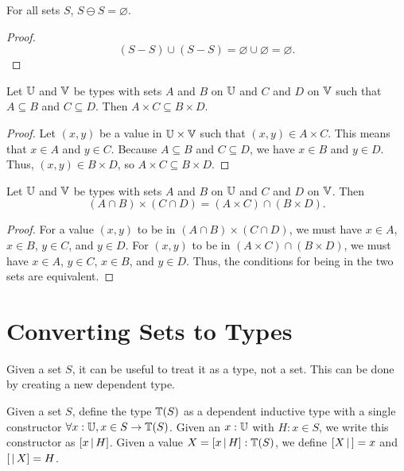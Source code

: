 \documentclass[../math.tex]{subfiles}
\begin{document}
\begin{theorem}
    For all sets $S$, $S \ominus S = \varnothing$.
\end{theorem}
\begin{proof}
    \[
        (S - S) \cup (S - S) = \varnothing \cup \varnothing = \varnothing.
    \]
\end{proof}

\begin{theorem}
    Let $\mathbb{U}$ and $\mathbb{V}$ be types with sets $A$ and $B$ on $\mathbb{U}$ and $C$ and $D$ on
    $\mathbb{V}$ such that $A \subseteq B$ and $C \subseteq D$.  Then $A \times C
    \subseteq B \times D$.
\end{theorem}
\begin{proof}
    Let $(x, y)$ be a value in $\mathbb{U} \times \mathbb{V}$ such that $(x, y) \in A \times C$.
    This means that $x \in A$ and $y \in C$.  Because $A \subseteq B$ and $C
    \subseteq D$, we have $x \in B$ and $y \in D$.  Thus, $(x, y) \in B \times
    D$, so $A \times C \subseteq B \times D$.
\end{proof}

\begin{theorem}
    Let $\mathbb{U}$ and $\mathbb{V}$ be types with sets $A$ and $B$ on $\mathbb{U}$ and $C$ and $D$ on
    $\mathbb{V}$.  Then
    \[
        (A \cap B) \times (C \cap D) = (A \times C) \cap (B \times D).
    \]
\end{theorem}
\begin{proof}
    For a value $(x, y)$ to be in $(A \cap B) \times (C \cap D)$, we must have
    $x \in A$, $x \in B$, $y \in C$, and $y \in D$.  For $(x, y)$ to be in $(A
    \times C) \cap (B \times D)$, we must have $x \in A$, $y \in C$, $x \in B$,
    and $y \in D$.  Thus, the conditions for being in the two sets are
    equivalent.
\end{proof}

\section{Converting Sets to Types}

Given a set $S$, it can be useful to treat it as a type, not a set.  This can be
done by creating a new dependent type.

\begin{definition}
    Given a set $S$, define the type $\mathbb{T}(S)$ as a dependent inductive type with
    a single constructor $\forall x : \mathbb{U}, x \in S \rightarrow \mathbb{T}(S)$.  Given an
    $x : \mathbb{U}$ with $H : x \in S$, we write this constructor as $[ x \, | \, H ]$.
    Given a value $X = [ x \, | \, H ] : \mathbb{T}(S)$, we define $[ X\, |\,] = x$ and $[ \,|\, X ]
    = H$.
\end{definition}
\end{document}
